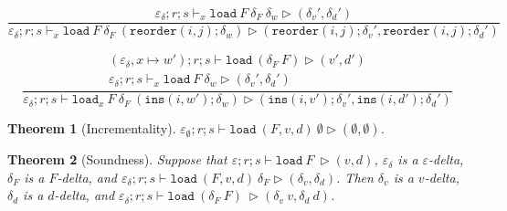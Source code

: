 \documentclass{report}
\theoremstyle{theorem}
\newtheorem{theorem}{Theorem}[section]
\begin{document}
\begin{displaymath}
	\frac{
		\varepsilon_\delta ; r ; s \vdash_x \mathtt{load}~F~ \delta_F ~\delta_w \rhd (\delta_v',\delta_d')
	}
	{\varepsilon_\delta ; r ; s \vdash_x \mathtt{load}~F~ \delta_F ~(\mathtt{reorder}(i,j);\delta_w) \rhd (\mathtt{reorder}(i,j);\delta_v',\mathtt{reorder}(i,j);\delta_d')}
\end{displaymath}

\begin{displaymath}
	\frac{\begin{array}{c}
		(\varepsilon_\delta,x \mapsto w') ; r ; s \vdash \mathtt{load}~ (\delta_F ~F) \rhd (v',d')\\
		\varepsilon_\delta ; r ; s \vdash_x \mathtt{load}~F~\delta_w \rhd (\delta_v',\delta_d')
	\end{array}}
	{\varepsilon_\delta ; r ; s \vdash \mathtt{load}_x~F~ \delta_F ~(\mathtt{ins}(i,w');\delta_w) \rhd (\mathtt{ins}(i,v');\delta_v',\mathtt{ins}(i,d');\delta_d')}
\end{displaymath}

\begin{theorem}[Incrementality]
	$\varepsilon_\emptyset ; r ; s \vdash \mathtt{load}~ (F,v,d)~ \emptyset \rhd (\emptyset,\emptyset)$.
\end{theorem}

\begin{theorem}[Soundness]
	Suppose that $\varepsilon ; r ; s \vdash \mathtt{load}~ F~ \rhd (v,d)$, $\varepsilon_\delta$ is a $\varepsilon$-delta, $\delta_F$ is a $F$-delta, and $\varepsilon_\delta ; r ; s \vdash \mathtt{load}~ (F,v,d)~ \delta_F \rhd (\delta_v,\delta_d)$.
	Then $\delta_v$ is a $v$-delta, $\delta_d$ is a $d$-delta, and $\varepsilon_\delta ; r ; s \vdash \mathtt{load}~ (\delta_F~F)~ \rhd (\delta_v~v,\delta_d~d)$.
\end{theorem}
	
\end{document}
